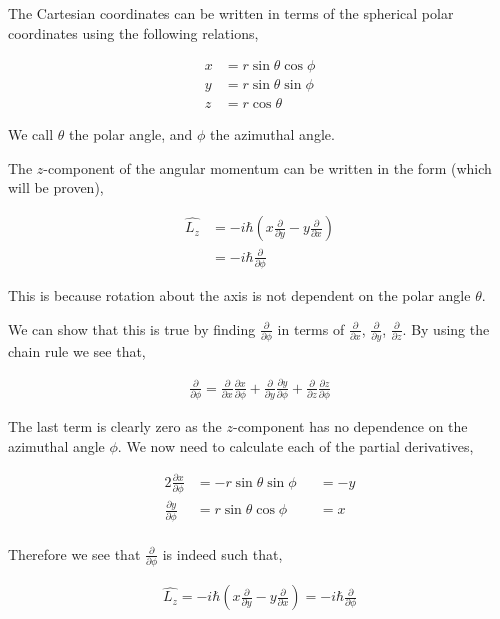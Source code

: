 \documentclass[11pt]{amsart}
\begin{document}
The Cartesian coordinates can be written in terms of the spherical polar coordinates using the following relations,

\begin{align*}
  x &= r\sin{\theta}\cos{\phi} \\
  y &= r\sin{\theta}\sin{\phi} \\
  z &= r\cos{\theta}
\end{align*}

We call $\theta$ the polar angle, and $\phi$ the azimuthal angle.

The $z$-component of the angular momentum can be written in the form (which will be proven),

\begin{align*}
  \hat{L_z} &= -i\hbar\left(x\frac{\partial}{\partial y}-y\frac{\partial}{\partial x}\right) \\
            &= -i\hbar\frac{\partial}{\partial\phi}
\end{align*}

This is because rotation about the axis is not dependent on the polar angle $\theta$.

We can show that this is true by finding $\frac{\partial}{\partial\phi}$ in terms of $\frac{\partial}{\partial x}$, $\frac{\partial}{\partial y}$, $\frac{\partial}{\partial z}$. By using the chain rule we see that,

\begin{align*}
  \frac{\partial}{\partial\phi}=\frac{\partial}{\partial x}\frac{\partial x}{\partial\phi}+\frac{\partial}{\partial y}\frac{\partial y}{\partial\phi}+\frac{\partial}{\partial z}\frac{\partial z}{\partial\phi}
\end{align*}

The last term is clearly zero as the $z$-component has no dependence on the azimuthal angle $\phi$. We now need to calculate each of the partial derivatives,

\begin{alignat*}{2}
  \frac{\partial x}{\partial\phi} &= -r\sin{\theta}\sin{\phi} &&= -y \\
  \frac{\partial y}{\partial\phi} &= r\sin{\theta}\cos{\phi}  &&= x \\
\end{alignat*}

Therefore we see that $\frac{\partial}{\partial\phi}$ is indeed such that,

\begin{align*}
  \hat{L_z}=-i\hbar\left(x\frac{\partial}{\partial y}-y\frac{\partial}{\partial x}\right)=-i\hbar\frac{\partial}{\partial\phi}
\end{align*}
\end{document}
